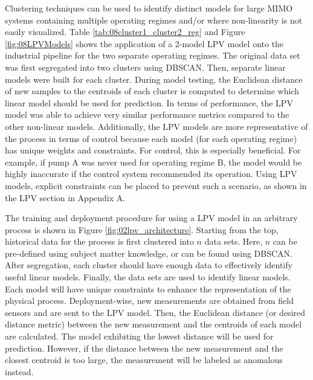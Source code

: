 Clustering techniques can be used to identify distinct models for large MIMO systems containing multiple operating regimes and/or where non-linearity is not easily visualized.  Table \ref{tab:08cluster1_cluster2_reg} and Figure \ref{fig:08LPVModels} shows the application of a 2-model LPV model onto the industrial pipeline for the two separate operating regimes.  The original data set was first segregated into two clusters using DBSCAN.  Then, separate linear models were built for each cluster. During model testing, the Euclidean distance of new samples to the centroids of each cluster is computed to determine which linear model should be used for prediction. In terms of performance, the LPV model was able to achieve very similar performance metrics compared to the other non-linear models.  Additionally, the LPV models are more representative of the process in terms of control because each model (for each operating regime) has unique weights and constraints. For control, this is especially beneficial.  For example, if pump A was never used for operating regime B, the model would be highly inaccurate if the control system recommended its operation.  Using LPV models, explicit constraints can be placed to prevent such a scenario, as shown in the LPV section in Appendix A.

The training and deployment procedure for using a LPV model in an arbitrary process is shown in Figure \ref{fig:02lpv_architecture}.  Starting from the top, historical data for the process is first clustered into $n$ data sets.  Here, $n$ can be pre-defined using subject matter knowledge, or can be found using DBSCAN.  After segregation, each cluster should have enough data to effectively identify useful linear models.  Finally, the data sets are used to identify linear models.  Each model will have unique constraints to enhance the representation of the physical process.  Deployment-wise, new measurements are obtained from field sensors and are sent to the LPV model.  Then, the Euclidean distance (or desired distance metric) between the new measurement and the centroids of each model are calculated. The model exhibiting the lowest distance will be used for prediction. However, if the distance between the new measurement and the closest centroid is too large, the measurement will be labeled as anomalous instead.

